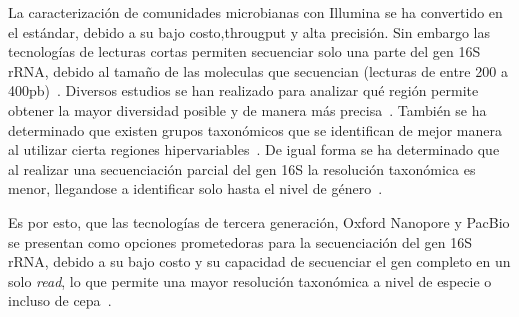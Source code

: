 La caracterización de comunidades microbianas con Illumina se ha convertido en el estándar, debido a su bajo costo,througput y alta precisión. Sin embargo las tecnologías de lecturas cortas permiten secuenciar solo una parte del gen 16S rRNA, debido al tamaño de las moleculas que secuencian (lecturas de entre 200 a 400pb)~\cite{salipante2014performance}. 
Diversos estudios se han realizado para analizar qué región permite obtener la mayor diversidad posible y de manera más precisa~\cite{liu2008accurate,schloss2011reducing}. También se ha determinado que existen grupos taxonómicos que se identifican de mejor manera al utilizar cierta regiones hipervariables~\cite{he2013comparison,claesson2010comparison}. De igual forma se ha determinado que al realizar una secuenciación parcial del gen 16S la resolución taxonómica es menor, llegandose a identificar solo hasta el nivel de género~\cite{liu2008accurate}.
 
Es por esto, que las tecnologías de tercera generación, Oxford Nanopore y PacBio se presentan como opciones prometedoras para la secuenciación del gen 16S rRNA, debido a su bajo costo y su capacidad de secuenciar el gen completo en un solo \textit{read}, lo que permite una mayor resolución taxonómica a nivel de especie o incluso de cepa~\cite{szoboszlay2023nanopore,10.1186/s13742}.%






